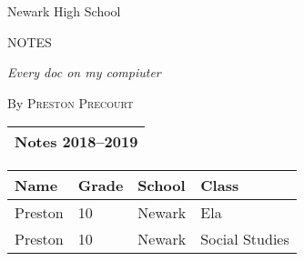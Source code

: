\documentclass{article}
\begin{document}
\begin{titlepage}
  \begin{center}
  \hfill
  \parbox{\linewidth}{%
    \centering
    Newark High School\par
  }
  \hfill
  \par
    \vspace{.05\textheight}
    {\LARGE\scshape NOTES\par}
    \vspace{.05\textheight}
    \par 
    {\itshape\large Every doc on my compiuter \par}
    \vspace{.05\textheight}
    By \textsc{Preston Precourt}\par
    \vspace{.05\textheight}
    \begin{tabularx}{\textwidth}{Y}
      \toprule
      {\Huge\bfseries Notes 2018--2019 \par} \\
      \bottomrule
    \end{tabularx}
    \vspace{.05\textheight}
    {\large \par}
    \vfill
    \noindent\begin{tabularx}{\textwidth}{XXXX}
      \toprule
      Name & Grade & School & Class \\
      \midrule
      Preston & 10 & Newark & Ela\\
      Preston & 10 & Newark & Social Studies\\
  \bottomrule
  \end{tabularx}
\end{center}
\end{titlepage}
\begin{multicols}{2}
\tableofcontents
\end{multicols}







\clearpage
{}
{}
  \printindex
\clearpage
{}
{}


\end{document}
